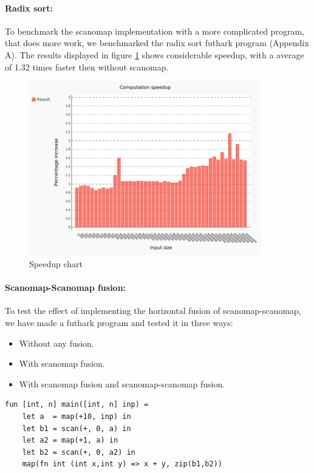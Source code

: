 \documentclass[11pt]{article}
\begin{document}
\paragraph*{Radix sort:}

To benchmark the scanomap implementation with a more complicated program, that does more work, we benchmarked the radix sort futhark program (Appendix A). The results displayed in figure \ref{fig:scanomap-radix} shows considerable speedup, with a average of 1.32 times faster then without scanomap.


\begin{figure}[hb]
  \centering
    \includegraphics[width=0.9\textwidth]{images/futhark-c-comparing.png}
  \caption{Speedup chart}
  \label{fig:scanomap-radix}
\end{figure}

\paragraph*{Scanomap-Scanomap fusion:}
To test the effect of implementing the horizontal fusion of scanomap-scanomap, we have made a futhark program and tested it in three ways:

\begin{itemize}
\item Without any fusion.
\item With scanomap fusion.
\item With scanomap fusion and scanomap-scanomap fusion.
\end{itemize}

\begin{lstlisting}[caption=Scanomap-scanomap benchmark program] 
fun [int, n] main([int, n] inp) =
    let a  = map(+10, inp) in
    let b1 = scan(+, 0, a) in
    let a2 = map(+1, a) in
    let b2 = scan(+, 0, a2) in
    map(fn int (int x,int y) => x + y, zip(b1,b2))

\end{lstlisting}
\end{document}
